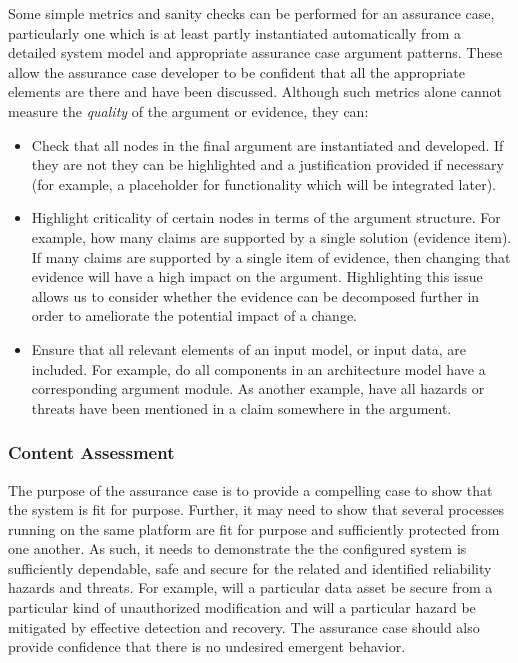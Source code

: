 \documentclass[12pt,twoside,a4paper]{article}
\begin{document}
Some simple metrics and sanity checks can be performed for an assurance case, particularly one which is at least partly instantiated automatically from a detailed system model and appropriate assurance case argument patterns. These allow the assurance case developer to be confident that all the appropriate elements are there and have been discussed. Although such metrics alone cannot measure the {\it quality} of the argument or evidence, they can:

\begin{itemize}
\item Check that all nodes in the final argument are instantiated and developed. If they are not they can be highlighted and a justification provided if necessary (for example, a placeholder for functionality which will be integrated later).
\item Highlight criticality of certain nodes in terms of the argument structure. For example, how many claims are supported by a single solution (evidence item). If many claims are supported by a single item of evidence, then changing that evidence will have a high impact on the argument. Highlighting this issue allows us to consider whether the evidence can be decomposed further in order to ameliorate the potential impact of a change.
\item Ensure that all relevant elements of an input model, or input data, are included. For example, do all components in an architecture model have a corresponding argument module. As another example, have all hazards or threats have been mentioned in a claim somewhere in the argument.
\end{itemize}

\subsubsection{Content Assessment}

The purpose of the assurance case is to provide a compelling case to show that the system is fit for purpose. Further, it may need to show that several processes running on the same platform are fit for purpose and sufficiently protected from one another.  As such, it needs to demonstrate the the configured system is sufficiently dependable, safe and secure for the related and identified reliability hazards and threats. For example, will a particular data asset be secure from a particular kind of unauthorized modification and will a particular hazard be mitigated by effective detection and recovery. The assurance case should also provide confidence that there is no undesired emergent behavior.
\end{document}
